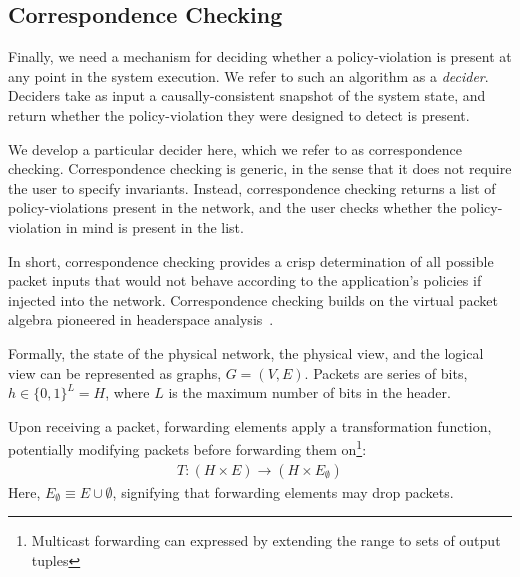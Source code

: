 
\subsection{Correspondence Checking}

Finally, we need a mechanism for deciding
whether a policy-violation is present at any point in the system execution.
We refer to such an algorithm as a {\em decider}. Deciders take as input a
causally-consistent snapshot of the system state, and return whether the
policy-violation they were designed to detect is present.

We develop a particular decider here, which we refer to as correspondence checking.
Correspondence checking is generic, in the sense that it does not require
the user to specify invariants. Instead, correspondence checking returns a list
of policy-violations present in the network, and the user checks whether the
policy-violation in mind is present in the list.

In short, correspondence checking provides a crisp determination of all possible packet inputs that
would not behave according to the application's policies if injected into the
network. Correspondence checking builds on the virtual packet algebra pioneered in headerspace
analysis~\cite{hsa}.


Formally, the state of the physical network, the physical view, and the
logical view can be represented as graphs,
$G = (V, E)$. Packets are series of bits, $h \in \{0,1\}^L = H$,
where $L$ is the maximum number of bits in the header.

Upon receiving a packet,
forwarding elements apply a transformation function, potentially modifying
packets before forwarding them on\footnote{Multicast forwarding can expressed
by extending the range to sets of output tuples}:
\begin{align*}
T: (H \times E) \rightarrow (H \times E_{\emptyset})
\end{align*}
Here, $E_{\emptyset} \equiv E \cup \emptyset$, signifying that forwarding elements
may drop packets.


